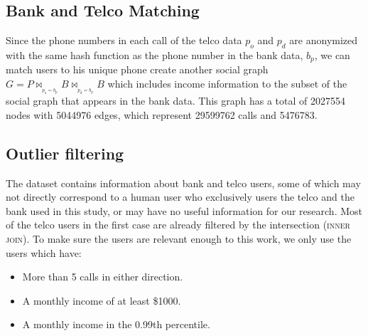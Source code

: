 \subsection{Bank and Telco Matching}

Since the phone numbers in each call of the telco data $ p_o $ and $ p_d $ are anonymized with the same hash function as the phone number in the bank data, $ b_p $, we can match users to his unique phone create another social graph $ G = P \bowtie_{_{p_o = b_p}} B \bowtie_{_{p_d = b_p}} B $ which includes income information to the subset of the social graph that appears in the bank data.
This graph has a total of \num{2027554} nodes with \num{5044976} edges, which represent \num{29599762} calls and \num{5476783}.

\subsection{Outlier filtering}

The dataset contains information about bank and telco users, some of which may not directly correspond to a human user who exclusively users the telco and the bank used in this study, or may have no useful information for our research. Most of the telco users in the first case are already filtered by the intersection (\textsc{inner join}). To make sure the users are relevant enough to this work, we only use the users which have:

\begin{itemize}
	\item More than 5 calls in either direction.
	\item A monthly income of at least \$\num{1000}.
	\item A monthly income in the \num{0.99}th percentile.
\end{itemize}
